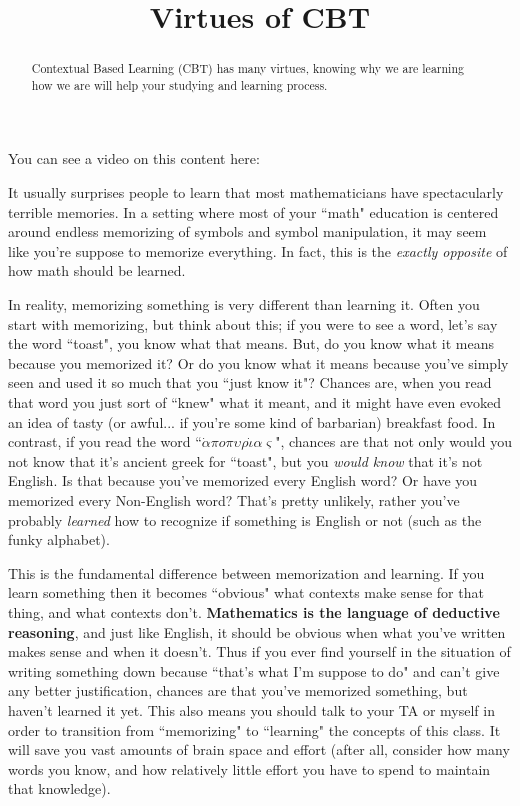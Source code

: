 \documentclass{ximera}
\title{Virtues of CBT}
\begin{document}
\begin{abstract}
Contextual Based Learning (CBT) has many virtues, knowing why we are learning how we are will help your studying and learning process.
\end{abstract}
\maketitle

You can see a video on this content here:


It usually surprises people to learn that most mathematicians have spectacularly terrible memories. In a setting where most of your ``math" education is centered around endless memorizing of symbols and symbol manipulation, it may seem like you're suppose to memorize everything. In fact, this is the \textit{exactly opposite} of how math should be learned.

In reality, memorizing something is very different than learning it. Often you start with memorizing, but think about this; if you were to see a word, let's say the word ``toast", you know what that means. But, do you know what it means because you memorized it? Or do you know what it means because you've simply seen and used it so much that you ``just know it"? Chances are, when you read that word you just sort of ``knew" what it meant, and it might have even evoked an idea of tasty (or awful... if you're some kind of barbarian) breakfast food. In contrast, if you read the word ``$\dot{\alpha}\pi o \pi\upsilon\rho\dot{\iota}\alpha\varsigma$", chances are that not only would you not know that it's ancient greek for ``toast", but you \textit{would know} that it's not English. Is that because you've memorized every English word? Or have you memorized every Non-English word? That's pretty unlikely, rather you've probably \textit{learned} how to recognize if something is English or not (such as the funky alphabet).

This is the fundamental difference between memorization and learning. If you learn something then it becomes ``obvious" what contexts make sense for that thing, and what contexts don't. \textbf{Mathematics is the language of deductive reasoning}, and just like English, it should be obvious when what you've written makes sense and when it doesn't. Thus if you ever find yourself in the situation of writing something down because ``that's what I'm suppose to do" and can't give any better justification, chances are that you've memorized something, but haven't learned it yet. This also means you should talk to your TA or myself in order to transition from ``memorizing" to ``learning" the concepts of this class. It will save you vast amounts of brain space and effort (after all, consider how many words you know, and how relatively little effort you have to spend to maintain that knowledge).
\end{document}
